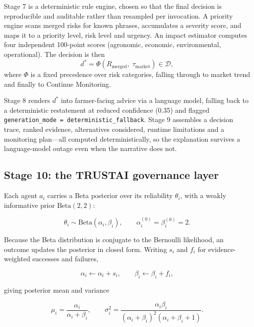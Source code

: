 \documentclass[preprint,12pt]{elsarticle}
\begin{document}
Stage 7 is a deterministic rule engine, chosen so that the final decision is
reproducible and auditable rather than resampled per invocation. A priority
engine scans merged risks for known phrases, accumulates a severity score,
and maps it to a priority level, risk level and urgency. An impact
estimator computes four independent 100-point scores (agronomic, economic,
environmental, operational). The decision is then
\begin{equation}
d^{\ast} = \Phi\!\left(R_{\mathrm{merged}},\; \tau_{\mathrm{market}}\right) \in \mathcal{D},
\end{equation}
where $\Phi$ is a fixed precedence over risk categories, falling through to
market trend and finally to Continue Monitoring.

Stage 8 renders $d^{\ast}$ into farmer-facing advice via a language model,
falling back to a deterministic restatement at reduced confidence (0.35)
and flagged \texttt{generation\_\allowbreak{}mode = deterministic\_\allowbreak{}fallback}. Stage 9
assembles a decision trace, ranked evidence, alternatives considered,
runtime limitations and a monitoring plan---all computed deterministically,
so the explanation survives a language-model outage even when the narrative
does not.

\subsection{Stage 10: the TRUSTAI governance layer}

Each agent $a_i$ carries a Beta posterior over its reliability
$\theta_i$, with a weakly informative prior $\mathrm{Beta}(2,2)$:

\begin{equation}
\theta_i \sim \mathrm{Beta}(\alpha_i, \beta_i), \qquad \alpha_i^{(0)}=\beta_i^{(0)}=2 .
\end{equation}

Because the Beta distribution is conjugate to the Bernoulli likelihood, an
outcome updates the posterior in closed form. Writing $s_i$ and $f_i$ for
evidence-weighted successes and failures,

\begin{equation}
\alpha_i \leftarrow \alpha_i + s_i, \qquad
\beta_i \leftarrow \beta_i + f_i ,
\label{eq:update}
\end{equation}

giving posterior mean and variance

\begin{equation}
\mu_i = \frac{\alpha_i}{\alpha_i+\beta_i}, \qquad
\sigma_i^{2} = \frac{\alpha_i \beta_i}{(\alpha_i+\beta_i)^2 (\alpha_i+\beta_i+1)} .
\label{eq:moments}
\end{equation}
\end{document}
